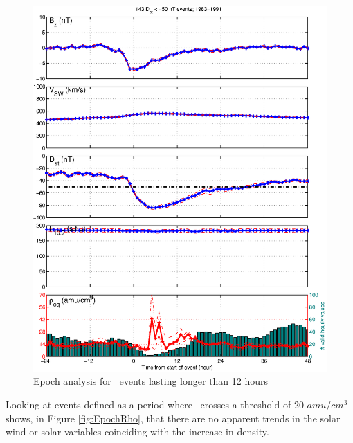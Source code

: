 \begin{figure}[htp!]
	\centering
	\includegraphics[width=1\linewidth]{Figures/StormAvs/stormavs-dd12-GOES6}
	\caption{Epoch analysis for \dst\ events lasting longer than 12 hours}
	\label{fig:EpochDst12Hour}
\end{figure}

Looking at events defined as a period where \req\ crosses a threshold of 20 $amu/cm^3$ shows, in Figure \ref{fig:EpochRho}, that there are no apparent trends in the solar wind or solar variables coinciding with the increase in density.

